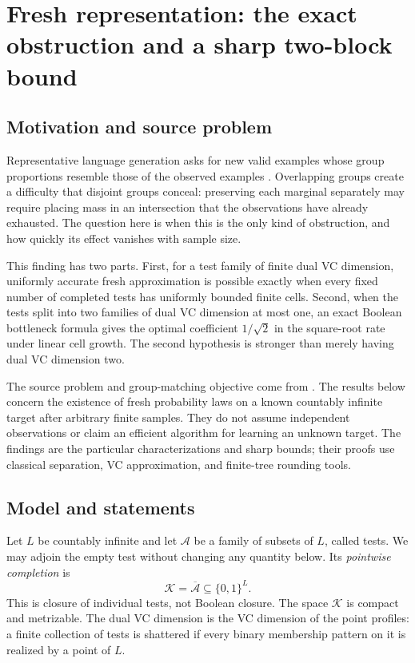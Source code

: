 \section{Fresh representation: the exact obstruction and a sharp two-block bound}
\label{ov:chapter}

\subsection{Motivation and source problem}
Representative language generation asks for new valid examples whose group proportions resemble those of the observed examples \citep{P09}. Overlapping groups create a difficulty that disjoint groups conceal: preserving each marginal separately may require placing mass in an intersection that the observations have already exhausted. The question here is when this is the only kind of obstruction, and how quickly its effect vanishes with sample size.

This finding has two parts. First, for a test family of finite dual VC dimension, uniformly accurate fresh approximation is possible exactly when every fixed number of completed tests has uniformly bounded finite cells. Second, when the tests split into two families of dual VC dimension at most one, an exact Boolean bottleneck formula gives the optimal coefficient $1/\sqrt2$ in the square-root rate under linear cell growth. The second hypothesis is stronger than merely having dual VC dimension two.

The source problem and group-matching objective come from \citet{P09}. The results below concern the existence of fresh probability laws on a known countably infinite target after arbitrary finite samples. They do not assume independent observations or claim an efficient algorithm for learning an unknown target. The findings are the particular characterizations and sharp bounds; their proofs use classical separation, VC approximation, and finite-tree rounding tools.

\subsection{Model and statements}
Let $L$ be countably infinite and let $\mathcal A$ be a family of subsets of $L$, called tests. We may adjoin the empty test without changing any quantity below. Its \emph{pointwise completion} is
\[
 \mathcal K=\overline{\mathcal A}\subseteq\{0,1\}^{L}.
\]
This is closure of individual tests, not Boolean closure. The space $\mathcal K$ is compact and metrizable. The dual VC dimension is the VC dimension of the point profiles: a finite collection of tests is shattered if every binary membership pattern on it is realized by a point of $L$.

